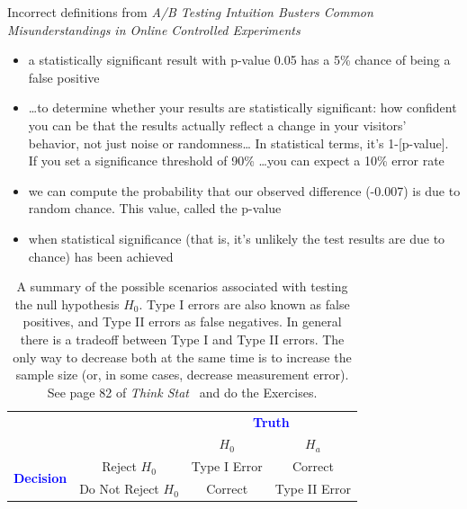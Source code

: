 \begin{tcolorbox}[colback=aliceblue!10!white,colframe=blue!70!black,title=\textbf{Remark}]
Incorrect definitions from \emph{A/B Testing Intuition Busters
Common Misunderstandings in Online Controlled Experiments}

\begin{itemize}
\setlength{\itemsep}{-2pt}
\item a statistically significant result
with p-value 0.05 has a 5\% chance of being a false positive

\item \dots to determine whether your results are statistically significant: how
confident you can be that the results actually reflect a change in your
visitors' behavior, not just noise or randomness… In statistical terms,
it's 1-[p-value]. If you set a significance threshold of 90\% \dots you can
expect a 10\% error rate

\item we can compute the probability that our observed difference (-0.007)
is due to random chance. This value, called the p-value

\item when statistical significance (that is, it's unlikely the test results are
due to chance) has been achieved
\end{itemize}

\end{tcolorbox}


\begin{table}[h]
\centering
\begin{tabular}{cc|cc}
 &  & \multicolumn{2}{c}{\textcolor{blue}{\textbf{Truth}}}  \\
 &  & $H_0$ & $H_a$ \\
\hline
\multirow{2}{*}{\textcolor{blue}{\textbf{Decision}}}
 & Reject $H_0$ & Type I Error & Correct \\
 & Do Not Reject $H_0$ & Correct & Type II Error \\
\end{tabular}
\caption{A summary of the possible scenarios associated with testing the
null hypothesis $H_0$. Type I errors are also known as false positives, and Type II
errors as false negatives.
In general there is a tradeoff between Type I and Type II errors. The only
way to decrease both at the same time is to increase the sample size (or, in
some cases, decrease measurement error).
See page 82 of \emph{Think Stat}~\citep{downey2011think}  and do the Exercises.
}
\vspace{2\baselineskip} 
\end{table}

